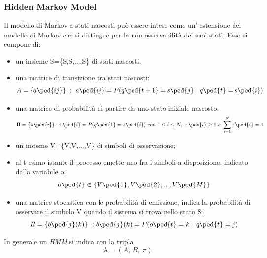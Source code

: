 \subsubsection*{Hidden Markov Model}
\label{3.3.2.3}
Il modello di Markov a stati nascosti può essere inteso come un' estensione del modello di Markov che si distingue per la non osservabilità dei suoi stati. Esso si compone di:
\begin{itemize}
\item un insieme S=\{S,S,...,S\} di stati nascosti;
\item una matrice di transizione tra stati nascosti:
\[ A=\{a\ped{ij}\}\ :\ a\ped{ij}=P(q\ped{t+1}=s\ped{j}\ |\ q\ped{t}=s\ped{i})\]
\item una matrice di probabilità di partire da uno stato iniziale nascosto:
\[ \Pi =\{\pi\ped{i}\}: \pi\ped{i}=P(q\ped{1} = s\ped{i})\ con\ 1\le i\le N,\  \pi\ped{i}\ge 0\  e\  \sum\limits_{i=1}^N \pi\ped{i} = 1 \]
\item un insieme V=\{V,V,...,V\} di simboli di osservazione;
\item al t-esimo istante il processo emette uno fra i simboli a disposizione, indicato dalla variabile o:
\[o\ped{t} \in\{V\ped{1},V\ped{2},...,V\ped{M}\}\]
\item una matrice stocastica con le probabilità di emissione, indica la probabilità di osservare il simbolo V quando il sistema si trova nello stato S:
\[ B=\{b\ped{j}(k)\}\ : b\ped{j}(k)=P(o\ped{t}=k\ |\ q\ped{t}=j)\]
\end{itemize}
In generale un \emph{HMM} si indica con la tripla
\[ \lambda=(A,\ B,\ \pi)\]
